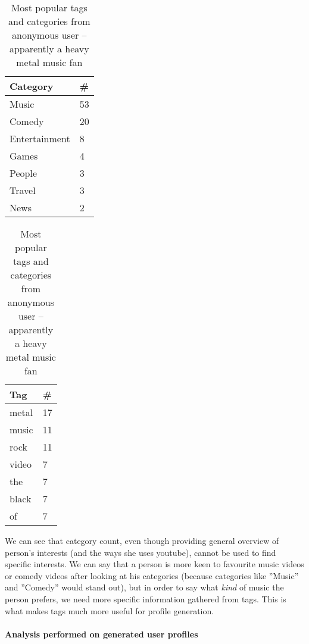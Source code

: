 \begin{table}[ht]
\begin{minipage}[b]{0.5\linewidth}\centering

\begin{tabular}{| l | l |}
Category & \# \\ \hline
Music & 53 \\
Comedy & 20 \\
Entertainment & 8 \\
Games & 4 \\
People & 3 \\
Travel & 3 \\
News & 2 \\
\end{tabular}

\end{minipage}
\hspace{0.5cm}
\begin{minipage}[b]{0.5\linewidth}
\centering

\begin{tabular}{| l | l |}
Tag & \# \\ \hline
metal & 17 \\
music & 11 \\
rock & 11 \\
video & 7 \\
the & 7 \\
black & 7 \\
of & 7 \\
\end{tabular}

\end{minipage}

\caption{Most popular tags and categories from anonymous user -- apparently a
heavy metal music fan}
\end{table}

We can see that category count, even though providing general overview of
person's interests (and the ways she uses youtube), cannot be used to find
specific interests. We can say that a person is more keen to
favourite music videos or comedy videos after looking at his categories
(because categories like ''Music'' and ''Comedy'' would stand out), but in
order to say what \textit{kind} of music the person prefers, we need more specific
information gathered from \eg tags. This is what makes tags much more useful
for profile generation.

\paragraph{Analysis performed on generated user profiles}

